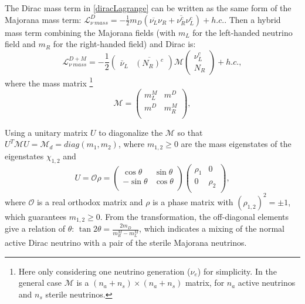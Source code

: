 The Dirac mass term in \ref{diracLagrange} can be written as the same form of the Majorana mass term: $\mathcal{L}_{\nu~mass}^D = -\frac{1}{2}m_D(\overline{\nu_L}\nu_R+\overline{\nu^c_R}\nu^c_L)+h.c.$. Then a hybrid mass term combining the Majorana fields (with $m_L$ for the left-handed neutrino field and $m_R$ for the right-handed field) and Dirac is\cite{akhmedov2014majorana,zuber1998physics}:
\begin{equation} 
\mathcal{L}^{D+M}_{\nu~mass} = -\frac{1}{2}\begin{pmatrix} \bar{\nu}_L & \overline{(N_R)^c}\end{pmatrix}
\mathcal{M}\begin{pmatrix} \nu^c_L \\ N_R\end{pmatrix}+h.c.,
\end{equation} 
where the mass matrix \footnote{Here only considering one neutrino generation ($\nu_e$) for simplicity. In the general case $\mathcal M$ is a $(n_a+n_s)\times(n_a+n_s)$ matrix, for $n_a$ active neutrinos and $n_s$ sterile neutrinos\cite{zuber1998physics,akhmedov2014majorana}.}  
\begin{equation}
\mathcal M=
\begin{pmatrix}
	m_L^M &  m^D\\
	m^D &  m_R^M\\
\end{pmatrix},
\end{equation}

Using a unitary matrix $U$ to diagonalize the $\mathcal M$ so that ${U}^T\mathcal{M} U =\mathcal {M}_d = diag(m_1, m_2)$, where $m_{1,2}\geq 0$ are the mass eigenstates of the eigenstates $\chi_{1,2}$ and 
\begin{equation}\label{eq:massTransform}
U=\mathcal{O}\rho=\begin{pmatrix}
\cos\theta & \sin\theta\\
-\sin\theta & \cos\theta\\
\end{pmatrix}\begin{pmatrix}
\rho_1 & 0\\
0 & \rho_2\\
\end{pmatrix},
\end{equation}
where $\mathcal O$ is a real orthodox matrix and $\rho$ is a phase matrix with $(\rho_{1,2})^2=\pm1$, which guarantees $m_{1,2}\geq 0$.
From the transformation, the off-diagonal elements give a relation of $\theta$: $\tan 2\theta = \frac{2m_D}{m^M_R-m^M_L}$, which indicates a mixing of the normal active Dirac neutrino with a pair of the sterile Majorana neutrinos.

